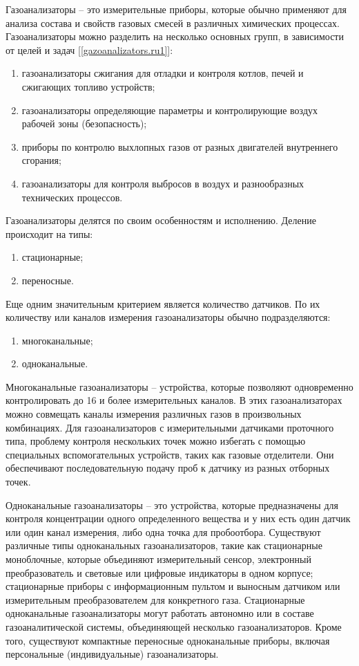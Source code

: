 \documentclass[14pt, a4paper]{extreport}
\begin{document}
	Газоанализаторы -- это измерительные приборы, которые обычно применяют для анализа состава и свойств газовых смесей в различных химических процессах. Газоанализаторы можно разделить на несколько основных групп, в зависимости от целей и задач [\ref{gazoanalizators.ru1}]:
	\begin{enumerate}[label={\arabic*)}]
		\item газоанализаторы сжигания для отладки и контроля котлов, печей и сжигающих топливо устройств;
		\item газоанализаторы определяющие параметры и контролирующие воздух рабочей зоны (безопасность);
		\item приборы по контролю выхлопных газов от разных двигателей внутреннего сгорания;
		\item газоанализаторы для контроля выбросов в воздух и разнообразных технических процессов.
	\end{enumerate}	
	
	Газоанализаторы делятся по своим особенностям и исполнению. Деление происходит на типы:
	\begin{enumerate}[label={\arabic*)}]
		\item стационарные;
		\item переносные.
	\end{enumerate}	
	
	Еще одним значительным критерием является количество датчиков. По их количеству или каналов измерения газоанализаторы обычно подразделяются:
	\begin{enumerate}[label={\arabic*)}]
		\item многоканальные;
		\item одноканальные.
	\end{enumerate}
	
	Многоканальные газоанализаторы -- устройства, которые позволяют одновременно контролировать до 16 и более измерительных каналов. В этих газоанализаторах можно совмещать каналы измерения различных газов в произвольных комбинациях. Для газоанализаторов с  измерительными датчиками проточного типа, проблему контроля нескольких точек можно избегать с помощью специальных вспомогательных устройств, таких как газовые отделители. Они обеспечивают последовательную подачу проб к датчику из разных отборных точек. 
	
	Одноканальные газоанализаторы -- это устройства, которые предназначены для контроля концентрации одного определенного вещества и у них есть один датчик или один канал измерения, либо одна точка для пробоотбора. Существуют различные типы одноканальных газоанализаторов, такие как стационарные моноблочные, которые объединяют измерительный сенсор, электронный преобразователь и световые или цифровые индикаторы в одном корпусе; стационарные приборы с информационным пультом и выносным датчиком или измерительным преобразователем для конкретного газа. Стационарные одноканальные газоанализаторы могут работать автономно или в составе газоаналитической системы, объединяющей несколько газоанализаторов. Кроме того, существуют компактные переносные одноканальные приборы, включая персональные (индивидуальные) газоанализаторы.
	
\end{document}
